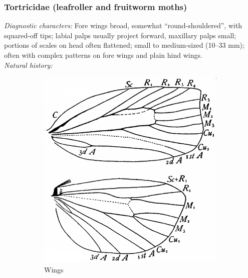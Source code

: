 \documentclass[letterpaper, 11pt]{article}
\begin{document}
\subsubsection{Tortricidae (leafroller and fruitworm moths)}
\noindent{}\textit{Diagnostic characters:} Fore wings broad, somewhat ``round-shouldered'', with squared-off tips; labial palps usually project forward, maxillary palps small; portions of scales on head often flattened; small to medium-sized (10--33 mm); often with complex patterns on fore wings and plain hind wings.\\

\noindent{}\textit{Natural history:} 

\begin{figure}[ht!]
    \centering
    \begin{subfigure}[ht!]{0.35\textwidth}
        \includegraphics[width=\textwidth]{TortricidWings}
        \caption{Wings \citep[Fig. 353]{comstock1918wings}}
        \label{fig:tortricid1}
    \end{subfigure}
    \qquad %
    \begin{subfigure}[ht!]{0.48\textwidth}

\end{subfigure}
\end{figure}
\end{document}
